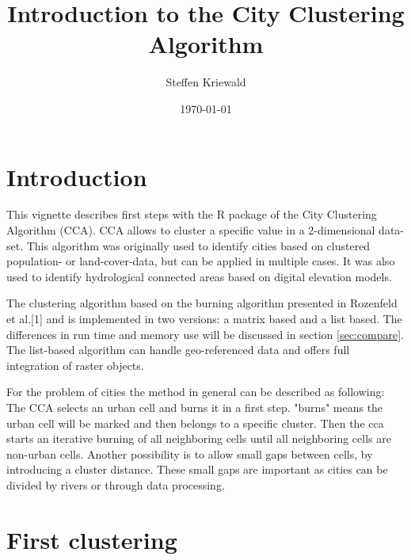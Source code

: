\documentclass[10pt,a4paper]{article}
\begin{document}


\title{Introduction to the City Clustering Algorithm}
\author{Steffen Kriewald}
\date{\today}
\maketitle
\tableofcontents

\section{Introduction}

This vignette describes first steps with the R package of the City Clustering Algorithm (CCA). CCA allows to cluster a specific value in a 2-dimensional data-set. This algorithm was originally used to identify cities based on clustered population- or land-cover-data, but can be applied in multiple cases. It was also used to identify hydrological connected areas based on digital elevation models.

The clustering algorithm based on the burning algorithm presented in Rozenfeld et al.[1] and is implemented in two versions: a matrix based and a list based. The differences in run time and memory use will be discussed in section \ref{sec:compare}. The list-based algorithm can handle geo-referenced data and offers full integration of raster objects.

For the problem of cities the method in general can be described as following: The CCA selects an urban cell and burns it in a first step. "burns" means the urban cell will be marked and then belongs to a specific cluster. Then the cca starts an iterative burning of all neighboring cells until all neighboring cells are non-urban cells. Another possibility is to allow small gaps between cells, by introducing a cluster distance. These small gaps are important as cities can be divided by rivers or through data processing.

\section{First clustering}
\label{sec:first}
\end{document}
